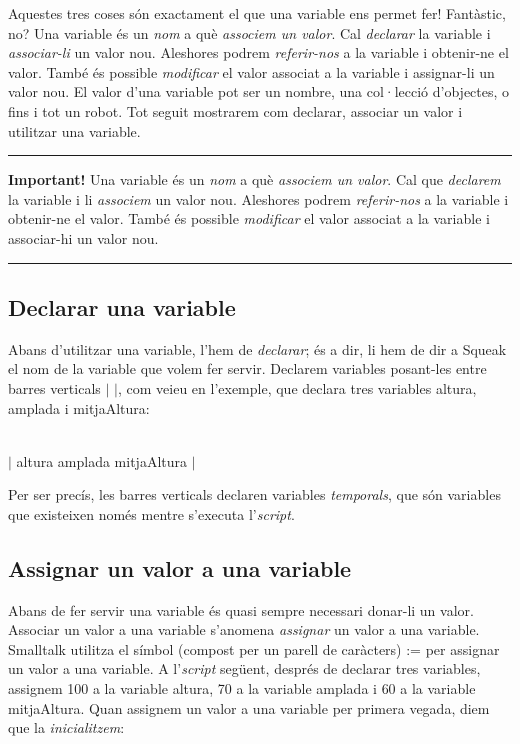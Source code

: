 Aquestes tres coses són exactament el que una variable ens permet fer!  Fantàstic, no? Una variable és un \emph{nom} a què \emph{associem un valor}. Cal \emph{declarar} la variable i \emph{associar-li} un valor nou. Aleshores podrem \emph{referir-nos} a la variable i obtenir-ne el valor. També és possible \emph{modificar} el valor associat a la variable i assignar-li un valor nou. El valor d'una variable pot ser un nombre, una col·lecció d'objectes, o fins i tot un robot. Tot seguit mostrarem com declarar, associar un valor i utilitzar una variable. 
\newpage
\noindent
\rule{\textwidth}{2pt}
\noindent
\textbf{Important!}  Una variable és un \emph{nom} a què \emph{associem un valor}. Cal que \emph{declarem} la variable i li \emph{associem} un valor nou. Aleshores podrem \emph{referir-nos} a la variable i obtenir-ne el valor. També és possible \emph{modificar} el valor associat a la variable i associar-hi un valor nou. \\
\noindent
\rule{\textwidth}{2pt}

\subsection{Declarar una variable}
Abans d'utilitzar una variable, l'hem de \emph{declarar}; és a dir, li hem de dir a Squeak el nom de la variable que volem fer servir. Declarem variables posant-les entre barres verticals $|$ $|$, com veieu en l'exemple, que declara tres variables \textsf{altura}, \textsf{amplada} i \textsf{mitjaAltura}:

\noindent
\textsf{ 
\\
$|$ altura amplada mitjaAltura $|$}
\vspace{3mm}

\noindent
Per ser precís, les barres verticals \textbar \hspace*{2mm} \textbar declaren variables \emph{temporals}, que són variables que existeixen només mentre s'executa l'\emph{script}.

\subsection{Assignar un valor a una variable}
Abans de fer servir una variable és quasi sempre necessari donar-li un valor. Associar un valor a una variable s'anomena \emph{assignar} un valor a una variable. Smalltalk utilitza el símbol (compost per un parell de caràcters) \textsf{:=} per assignar un valor a una variable. A l'\emph{script} següent, després de declarar tres variables, assignem \textsf{100} a la variable \textsf{altura}, \textsf{70} a la variable \textsf{amplada} i \textsf{60} a la variable \textsf{mitjaAltura}. Quan assignem un valor a una variable per primera vegada, diem que la \emph{inicialitzem}:

